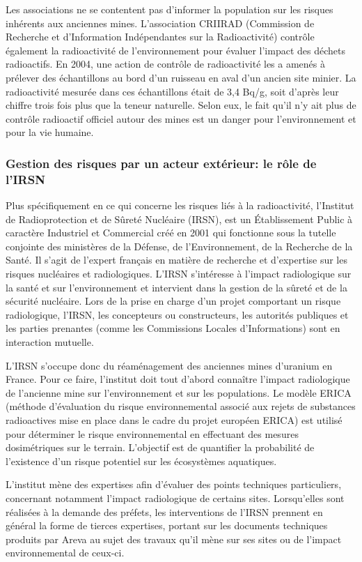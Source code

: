 \documentclass{article}
\begin{document}
Les associations ne se contentent pas d’informer la population sur les risques inhérents aux anciennes mines. L’association CRIIRAD (Commission de Recherche et d’Information Indépendantes sur la Radioactivité)  contrôle également la radioactivité de l’environnement pour évaluer l’impact des déchets radioactifs. En 2004, une action de contrôle de radioactivité les a amenés à prélever des échantillons au bord d’un ruisseau en aval d’un ancien site minier. La radioactivité mesurée dans ces échantillons était de 3,4 Bq/g, soit d’après leur chiffre trois fois plus que la teneur naturelle. Selon eux, le fait qu’il n’y ait plus de contrôle radioactif officiel autour des mines est un danger pour l’environnement et pour la vie humaine. 


\subsubsection{Gestion des risques par un acteur extérieur: le rôle de l’IRSN}
Plus spécifiquement en ce qui concerne les risques liés à la radioactivité, l'Institut de Radioprotection et de Sûreté Nucléaire (IRSN), est un Établissement Public à caractère Industriel et Commercial créé en 2001 qui fonctionne sous la tutelle conjointe des ministères de la Défense, de l’Environnement, de la Recherche de la Santé. Il s’agit de l’expert français en matière de recherche et d’expertise sur les risques nucléaires et radiologiques. L’IRSN s’intéresse à l’impact radiologique sur la santé et sur l'environnement et intervient dans la gestion de la sûreté et de la sécurité nucléaire.  Lors de la prise en charge d’un projet comportant un risque radiologique, l’IRSN, les concepteurs ou constructeurs, les autorités publiques et les parties prenantes (comme les Commissions Locales d’Informations) sont en interaction mutuelle.

L’IRSN s’occupe donc  du réaménagement des anciennes mines d’uranium en France. Pour ce faire, l’institut doit tout d’abord connaître l’impact radiologique de l’ancienne mine sur l’environnement et sur les populations. Le modèle ERICA (méthode d’évaluation du risque environnemental associé aux rejets de substances radioactives mise en place dans le cadre du projet européen ERICA) est utilisé pour déterminer  le risque environnemental en effectuant des mesures dosimétriques sur le terrain. L’objectif est de quantifier la probabilité de l’existence d’un risque potentiel sur les écosystèmes aquatiques.

L’institut  mène  des  expertises  afin  d’évaluer  des  points  techniques  particuliers,  concernant notamment l’impact radiologique de certains sites. Lorsqu’elles sont réalisées à la demande des préfets, les interventions de l’IRSN prennent en général la forme de tierces expertises, portant sur les documents techniques produits par Areva au sujet des travaux qu’il mène sur  ses  sites  ou  de  l’impact  environnemental  de  ceux-ci.
\end{document}
